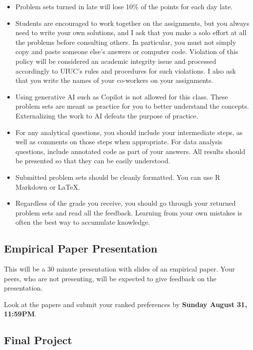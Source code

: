 \documentclass[11pt,letterpaper]{article}
\begin{document}
\begin{itemize}[leftmargin=*]
  \item Problem sets turned in late will lose 10\% of the points for each day late.
  \item Students are encouraged to work together on the assignments, but you always need to write your own solutions, and I ask that you make a solo effort at all the problems before consulting others. In particular, you must not simply copy and paste someone else's answers or computer code. Violation of this policy will be considered an academic integrity issue and processed accordingly to UIUC's rules and procedures for such violations. I also ask that you write the names of your co-workers on your assignments.
  \item Using generative AI such as Copilot is not allowed for this class. These problem sets are meant as practice for you to better understand the concepts. Externalizing the work to AI defeats the purpose of practice.
  \item For any analytical questions, you should include your intermediate steps, as well as comments on those steps when appropriate. For data analysis questions, include annotated code as part of your answers. All results should be presented so that they can be easily understood.
  \item Submitted problem sets should be cleanly formatted. You can use R Markdown or \LaTeX.
  \item Regardless of the grade you receive, you should go through your returned problem sets and read all the feedback. Learning from your own mistakes is often the best way to accumulate knowledge.
\end{itemize}

\subsection*{Empirical Paper Presentation}

This will be a 30 minute presentation with slides of an empirical paper. Your peers, who are not presenting, will be expected to give feedback on the presentation.

Look at the papers and submit your ranked preferences by \textbf{Sunday August 31, 11:59PM}.

\subsection*{Final Project}
\end{document}
